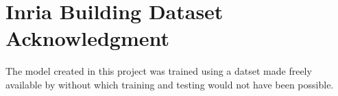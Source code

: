 \section{Inria Building Dataset Acknowledgment}
The model created in this project was trained using a datset made freely available by \citet{maggiori17a} without which training and testing would not have been possible.


